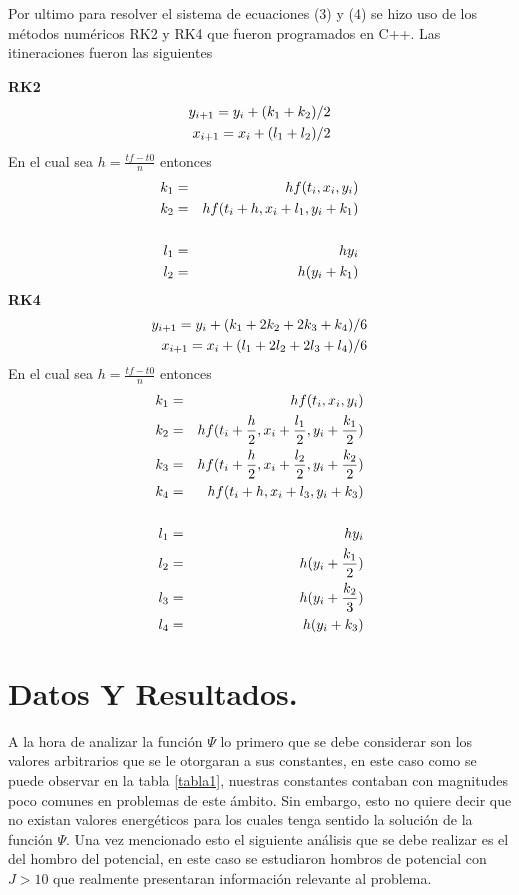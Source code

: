\documentclass[twocolumn,preprintnumbers,amsmath,amssymb,aps,prl]{revtex4}
\begin{document}
Por ultimo para resolver el sistema de ecuaciones (3) y (4) se hizo uso de los métodos numéricos RK2 y RK4 que fueron programados en C++. Las itineraciones fueron las siguientes 

\textbf{RK2}
\begin{eqnarray}\notag
y_{i+1}=y_i+(k_1+k_2)/2 \\\notag
x_{i+1}=x_i+(l_1+l_2)/2
\end{eqnarray}
En el cual sea $h=\frac{tf-t0}{n}$ entonces 
\begin{eqnarray}\notag
k_1&=&hf(t_i,x_i,y_i) \\\notag
k_2&=&hf(t_i+h,x_i+l_1,y_i+k_1) \\\notag
                                \\\notag
l_1&=&hy_i                    \\\notag
l_2&=&h(y_i+k_1)              
\end{eqnarray}
\textbf{RK4}
\begin{eqnarray}\notag
y_{i+1}=y_i+(k_1+2k_2+2k_3+k_4)/6 \\\notag
x_{i+1}=x_i+(l_1+2l_2+2l_3+l_4)/6
\end{eqnarray}
En el cual sea $h=\frac{tf-t0}{n}$ entonces 
\begin{eqnarray}\notag
k_1&=&hf(t_i,x_i,y_i) \\\notag
k_2&=&hf(t_i+\frac{h}{2},x_i+\frac{l_1}{2},y_i+\frac{k_1}{2}) \\\notag
k_3&=&hf(t_i+\frac{h}{2},x_i+\frac{l_2}{2},y_i+\frac{k_2}{2})\\\notag
k_4&=&hf(t_i+h,x_i+l_3,y_i+k_3)\\\notag
                                \\\notag
l_1&=&hy_i                    \\\notag
l_2&=&h(y_i+\frac{k_1}{2}) \\\notag
l_3&=&h(y_i+\frac{k_2}{3}) \\\notag
l_4&=&h(y_i+k_3) 
\end{eqnarray}
\section{Datos Y Resultados.}
A la hora de analizar la función $\Psi$ lo primero que se debe considerar son los valores arbitrarios que se le otorgaran a sus constantes, en este caso como se puede observar en la tabla \ref{tabla1}, nuestras constantes contaban con magnitudes poco comunes en problemas de este ámbito. Sin embargo, esto no quiere decir que no existan valores energéticos para los cuales tenga sentido la solución de la función $\Psi$. Una vez mencionado esto el siguiente análisis que se debe realizar es el del hombro del potencial, en este caso se estudiaron hombros de potencial con $J>10$ que realmente presentaran información relevante al problema.
\end{document}
